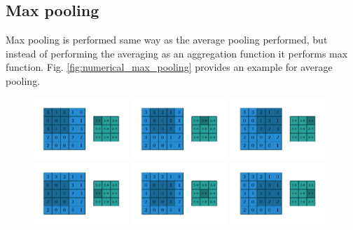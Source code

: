 \subsection{Max pooling}
Max pooling is performed same way as the average pooling performed, but instead of performing the averaging as an aggregation function it performs max function. Fig. \ref{fig:numerical_max_pooling} provides an example for average pooling.
\begin{figure}
    \centering
    \includegraphics[width=0.32\textwidth]{pdf/numerical_max_pooling_00.pdf}
    \includegraphics[width=0.32\textwidth]{pdf/numerical_max_pooling_01.pdf}
    \includegraphics[width=0.32\textwidth]{pdf/numerical_max_pooling_02.pdf}
    \includegraphics[width=0.32\textwidth]{pdf/numerical_max_pooling_03.pdf}
    \includegraphics[width=0.32\textwidth]{pdf/numerical_max_pooling_04.pdf}
    \includegraphics[width=0.32\textwidth]{pdf/numerical_max_pooling_05.pdf}

\end{figure}
